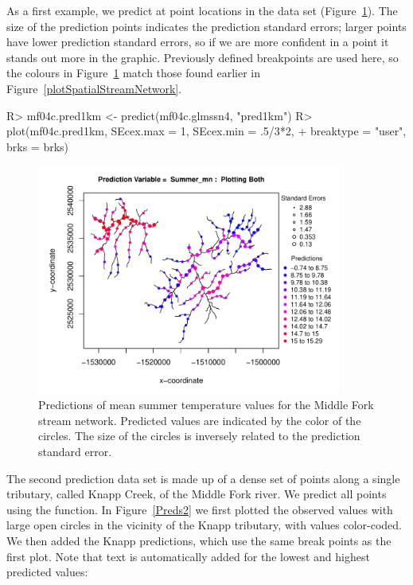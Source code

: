 \documentclass[nojss]{jss}
\renewenvironment{Schunk}{\vspace{\topsep}}{\vspace{\topsep}}
\begin{document}
As a first example, we predict at point locations in the
 data set (Figure~\ref{Preds1}). The size of the
prediction points indicates the prediction standard errors; larger
points have lower prediction standard errors, so if we are more
confident in a point it stands out more in the graphic. Previously
defined breakpoints are used here, so the colours in
Figure~\ref{Preds1} match those found earlier in
Figure~\ref{plotSpatialStreamNetwork}.

\begin{Schunk}
\begin{Sinput}
R> mf04c.pred1km <- predict(mf04c.glmssn4, "pred1km")
R> plot(mf04c.pred1km, SEcex.max = 1, SEcex.min = .5/3*2,
+       breaktype = "user", brks = brks)
\end{Sinput}
\end{Schunk}

\begin{figure}[htbp]
  \begin{center}
    \includegraphics[keepaspectratio=true, width = 100mm]{Figures/jss984Fig-Preds1}
    \caption{Predictions of mean summer temperature values for the Middle Fork stream network. Predicted
      values are indicated by the color of the circles. The size of
      the circles is inversely related to the prediction standard
      error.}\label{Preds1}
  \end{center}
\end{figure}

The second prediction data set is made up of a dense set of points
along a single tributary, called Knapp Creek, of the Middle Fork
river. We predict all points using the  function. In
Figure~\ref{Preds2} we first plotted the observed values with large
open circles in the vicinity of the Knapp tributary, with values
color-coded. We then added the Knapp predictions, which use the same
break points as the first plot. Note that text is automatically added
for the lowest and highest predicted values:
\end{document}

